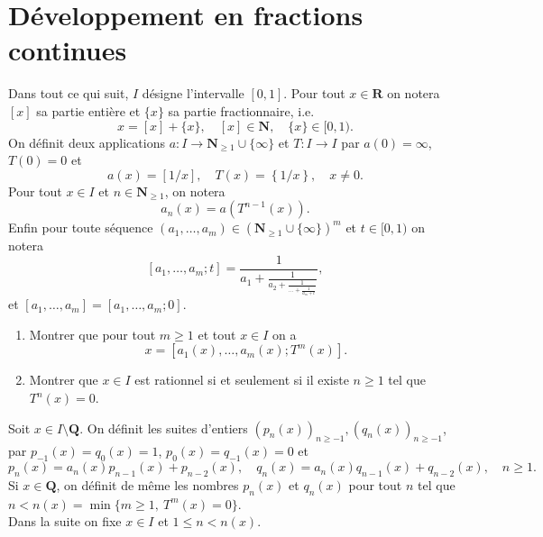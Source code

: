 \documentclass[a4paper,12pt]{article}
\theoremstyle{plain}
\theoremstyle{definition}
\newcommand{\R}{\mathbf{R}}
\newcommand{\N}{\mathbf{N}}
\newcommand{\Q}{\mathbf{Q}}
\begin{document}
\section*{D\'eveloppement en fractions continues}

\noindent Dans tout ce qui suit, $I$ d\'esigne l'intervalle $[0,1]$. Pour tout $x \in \R$ on notera $[x]$ sa partie enti\`ere et $\{x\}$ sa partie fractionnaire, i.e.
$$
x = [x] + \{x\}, \quad [x] \in \N, \quad \{x\} \in [0,1).
$$
On d\'efinit deux applications $a : I \to \N_{\geq 1} \cup \{\infty\}$ et $T : I \to I$ par $a(0) = \infty$, $T(0) = 0$ et
$$
a(x) = \left[1/x\right], \quad T(x) = \left\{1/x\right\}, \quad x \neq 0.
$$
Pour tout $x \in I$ et $n \in \N_{\geq 1}$, on notera
$$
a_n(x) = a(T^{n-1}(x)).
$$
Enfin pour toute s\'equence $(a_1, \dots, a_m) \in (\N_{\geq 1} \cup \{\infty\})^m$ et $t \in [0,1)$ on notera
$$
[a_1, \dots, a_m; t] = \frac{1}{\displaystyle{a_1 + \frac{1}{\displaystyle{a_2 + \frac{1}{\displaystyle{\dots + {\displaystyle{\frac{1}{a_m + t}}}}}}}}},
$$
et $[a_1, \dots, a_m] = [a_1, \dots, a_m; 0].$


\begin{enumerate}[resume,label=\textbf{\arabic*.}]

\item Montrer que pour tout $m \geq 1$ et tout $x \in I$ on a 
$$
x = \left[a_1(x), \dots, a_m(x) ; T^m(x)\right].
$$

\item Montrer que $x \in I$ est rationnel si et seulement si il existe $n \geq 1$ tel que $T^n(x) = 0$.

\end{enumerate}

\noindent Soit $x \in I \setminus \Q$. On d\'efinit les suites d'entiers $(p_n(x))_{n \geq -1}, (q_n(x))_{n \geq -1}$, par $p_{-1}(x) = q_0(x) = 1$, $p_0(x) = q_{-1}(x) = 0$ et 
$$
p_n(x) = a_n(x) p_{n-1}(x) + p_{n-2}(x), \quad q_{n}(x) = a_n(x) q_{n-1}(x) + q_{n-2}(x), \quad n \geq 1.
$$
Si $x \in \Q$, on d\'efinit de m\^eme les nombres $p_n(x)$ et $q_n(x)$ pour tout $n$ tel que $n < n(x) = \min \{m \geq 1, ~T^m(x) = 0\}$.  \\

\noindent Dans la suite on fixe $x \in I$ et $1 \leq n < n(x)$.
\end{document}
